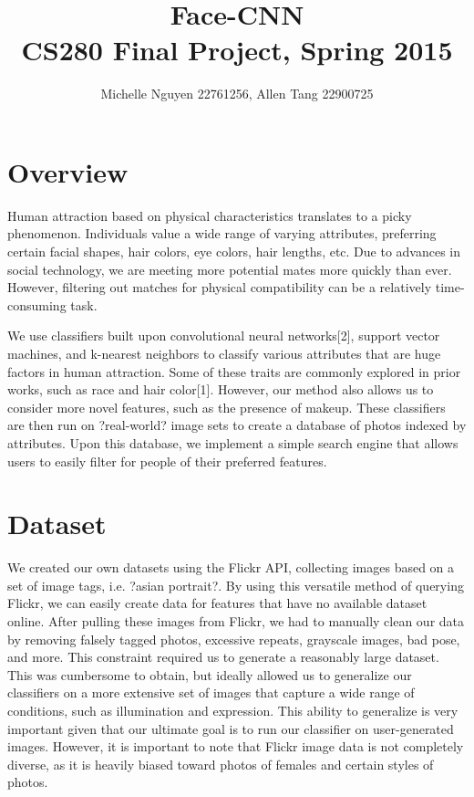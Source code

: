 \documentclass[letterpaper,10pt, twocolumn]{article}
\begin{document}
\title{\vspace{-2.5cm} \textbf{Face-CNN} \\ \normalsize CS280 Final Project, Spring 2015}
\author{Michelle Nguyen 22761256, Allen Tang 22900725}
\date{}

\maketitle

\section{Overview}
Human attraction based on physical characteristics translates to a picky phenomenon. Individuals value a wide range of varying attributes, preferring certain facial shapes, hair colors, eye colors, hair lengths, etc. Due to advances in social technology, we are meeting more potential mates more quickly than ever. However, filtering out matches for physical compatibility can be a relatively time-consuming task. 

We use classifiers built upon convolutional neural networks[2], support vector machines, and k-nearest neighbors to classify various attributes that are huge factors in human attraction. Some of these traits are commonly explored in prior works, such as race and hair color[1]. However, our method also allows us to consider more novel features, such as the presence of makeup. These classifiers are then run on ?real-world? image sets to create a database of photos indexed by attributes. Upon this database, we implement a simple search engine that allows users to easily filter for people of their preferred features. 


\section{Dataset}
We created our own datasets using the Flickr API, collecting images based on a set of image tags, i.e. ?asian portrait?. By using this versatile method of querying Flickr, we can easily create data for features that have no available dataset online. After pulling these images from Flickr, we had to manually clean our data by removing falsely tagged photos, excessive repeats, grayscale images, bad pose, and more. This constraint required us to generate a reasonably large dataset. This was cumbersome to obtain, but ideally allowed us to generalize our classifiers on a more extensive set of images that capture a wide range of conditions, such as illumination and expression. This ability to generalize is very important given that our ultimate goal is to run our classifier on user-generated images. However, it is important to note that Flickr image data is not completely diverse, as it is heavily biased toward photos of females and certain styles of photos.
\end{document}
